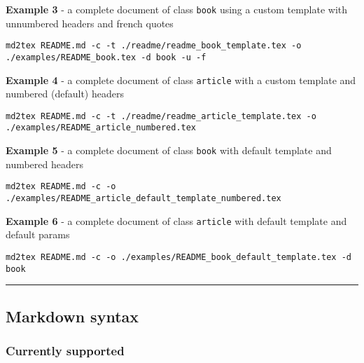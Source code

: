 \documentclass[a4paper, 12pt, twoside]{article}
\begin{document}
\textbf{Example 3} - a complete document of class \texttt{book} using a custom template with unnumbered headers and french quotes

\begin{listing}[h!]
   \begin{verbatim}
md2tex README.md -c -t ./readme/readme_book_template.tex -o ./examples/README_book.tex -d book -u -f

   \end{verbatim}
\end{listing}

\textbf{Example 4} - a complete document of class \texttt{article} with a custom template and numbered (default) headers

\begin{listing}[h!]
   \begin{verbatim}
md2tex README.md -c -t ./readme/readme_article_template.tex -o ./examples/README_article_numbered.tex

   \end{verbatim}
\end{listing}

\textbf{Example 5} - a complete document of class \texttt{book} with default template and numbered headers

\begin{listing}[h!]
   \begin{verbatim}
md2tex README.md -c -o ./examples/README_article_default_template_numbered.tex

   \end{verbatim}
\end{listing}

\textbf{Example 6} - a complete document of class \texttt{article} with default template and default params

\begin{listing}[h!]
   \begin{verbatim}
md2tex README.md -c -o ./examples/README_book_default_template.tex -d book

   \end{verbatim}
\end{listing}

\par\noindent\rule{\linewidth}{0.4pt}
\subsection{Markdown syntax}
\subsubsection{Currently supported}
\end{document}
